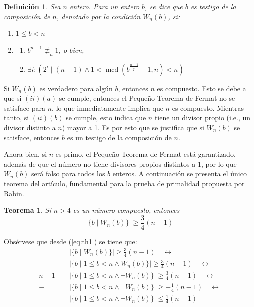 \documentclass[hidelinks, 12pt]{article}
\DeclareMathOperator{\mcd}{mcd}
\newcommand{\llra}{\longleftrightarrow}
\newtheorem{theorem}{Teorema}
\newtheorem*{definition}{Definición}
\begin{document}
\begin{definition}
    Sea $n$ entero. Para un entero $b$, se dice que $b$ es testigo de la composición de $n$, denotado por la condición $W_n(b)$, si:
    \begin{enumerate}[label=\textup{(}\roman*\textup{)}]
        \item $1\leq b<n$
        \item \begin{enumerate}[label=\textup{(}\alph*\textup{)}] 
            \item $b^{n-1}\not\equiv_n 1$\textup{, o bien,}
            \item $\exists i:(2^i\mid(n-1)\wedge 1<\mcd(b^{\frac{n-1}{2^i}}-1,n)<n)$
        \end{enumerate}
    \end{enumerate}
\end{definition}

Si $W_n(b)$ es verdadero para algún $b$, entonces $n$ es compuesto. Esto se debe a que si $(ii)(a)$ se cumple, entonces el Pequeño Teorema de Fermat no se satisface para $n$, lo que inmediatamente implica que $n$ es compuesto. Mientras tanto, si $(ii)(b)$ se cumple, esto indica que $n$ tiene un divisor propio (i.e., un divisor distinto a $n$) mayor a 1. Es por esto que se justifica que si $W_n(b)$ se satisface, entonces $b$ es un testigo de la composición de $n$.

Ahora bien, si $n$ es primo, el Pequeño Teorema de Fermat está garantizado, además de que el número no tiene divisores propios distintos a 1, por lo que $W_n(b)$ será falso para todos los $b$ enteros. A continuación se presenta el único teorema del artículo, fundamental para la prueba de primalidad propuesta por Rabin.

\begin{theorem}
\label{th:1}
    Si $n>4$ es un número compuesto, entonces 
    \begin{equation}
        |\{b\mid W_n(b)\}|\geq \frac{3}{4}(n-1)
        \label{eq:th1}
    \end{equation}
\end{theorem}

Obsérvese que desde (\ref{eq:th1}) se tiene que:
\begin{align*}
    &|\{b\mid W_n(b)\}|\geq\frac{3}{4}(n-1) \quad\llra\\
    &|\{b\mid 1\leq b<n\wedge W_n(b)\}|\geq \frac{3}{4}(n-1) \quad\llra\\
    n-1-&|\{b\mid 1\leq b<n\wedge\neg W_n(b)\}|\geq\frac{3}{4}(n-1) \quad\llra\\
    -&|\{b\mid 1\leq b<n\wedge\neg W_n(b)\}|\geq-\frac{1}{4}(n-1) \quad\llra\\
    &|\{b\mid 1\leq b<n\wedge\neg W_n(b)\}|\leq\frac{1}{4}(n-1) \\
\end{align*}
\end{document}
